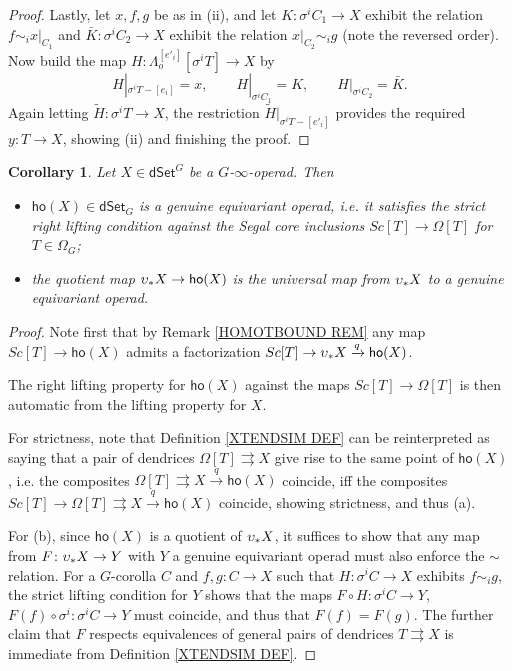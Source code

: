 \documentclass[a4paper,10pt
,draft
]{article}%
\numberwithin{equation}{section}
\numberwithin{figure}{section}
\newtheorem{corollary}[equation]{Corollary}%
\theoremstyle{definition} %
\newcommand{\1}{\ensuremath{\mathbbm 1}}%
\begin{document}
\begin{proof}
Lastly, let $x,f,g$ be as in (ii), 
and let
$K \colon \sigma^i C_1 \to X$ exhibit the relation
$f \sim_i x|_{C_1}$
and 
$ \bar{K} \colon \sigma^i C_2 \to X$
exhibit the relation
$x|_{C_2} \sim_i g$ (note the reversed order).
Now build the map
$H \colon \Lambda_o^{[e'_i]}[\sigma^i T] \to X$ by
\[
	H|_{\sigma^i T - [e_i]} = x,
\qquad
	H|_{\sigma^i C_1} = K,
\qquad
	H|_{\sigma^i C_2} = \bar{K}.
\]
Again letting 
$\widetilde{H} \colon \sigma^i T \to X$,
the restriction 
$\widetilde{H}|_{\sigma^i T - [e'_i]}$
provides the required $y \colon T \to X$,
showing (ii) and finishing the proof.
\end{proof}


\begin{corollary}\label{HOOPUNIV COR}
Let $X \in \mathsf{dSet}^G$ be a $G$-$\infty$-operad. Then
	\begin{itemize}
	\item[(a)] $\mathsf{ho}(X)\in \mathsf{dSet}_G$ is a genuine equivariant operad, i.e. it satisfies the strict right lifting condition against the Segal core inclusions
	$Sc[T] \to \Omega[T]$ for $T \in \Omega_G$;
	\item[(b)] the quotient map
	$\upsilon_{\**}X \to \mathsf{ho}(X)$ is the universal map from $\upsilon_{\**}X$ to a genuine equivariant operad.
	\end{itemize}
\end{corollary}

\begin{proof}
	Note first that by Remark \ref{HOMOTBOUND REM}
	any map 	$Sc[T] \to \mathsf{ho}(X)$ admits a factorization 
	$Sc[T] \to \upsilon_{\**}X \xrightarrow{q} \mathsf{ho}(X)$.
	
	The right lifting property for $\mathsf{ho}(X)$
	against the maps $Sc[T] \to \Omega[T]$
	is then automatic from the lifting property for $X$.

	For strictness,	
	note that Definition \ref{XTENDSIM DEF}
	can be reinterpreted as saying that
	a pair of dendrices $\Omega[T] \rightrightarrows X$
	give rise to the same point of 
	$\mathsf{ho}(X)$, i.e. 
	the composites 
	$\Omega[T] \rightrightarrows X \xrightarrow{q}
	\mathsf{ho}(X)$ coincide, 
	iff the composites 
	$Sc[T] \to \Omega[T] \rightrightarrows X \xrightarrow{q}
	\mathsf{ho}(X)$ coincide, showing strictness, and thus (a).
		
	For (b), since $\mathsf{ho}(X)$ is a quotient of
	$\upsilon_{\**} X$, it suffices to show that any map
	from $F \colon \upsilon_{\**}X \to Y$ with $Y$ a genuine equivariant operad must also enforce the $\sim$ relation.
	For a $G$-corolla $C$ and
	$f,g\colon C \to X$ such that 
	$H \colon \sigma^i C \to X$ exhibits
	$f \sim_i g$, 
	the strict lifting condition for $Y$
	shows that the maps
	$F\circ H \colon \sigma^i C \to Y$,
	$F(f) \circ \sigma^i \colon \sigma^i C \to Y$
	must coincide, and thus that
	$F(f)=F(g)$.
	The further claim that $F$ respects equivalences
	of general pairs of dendrices $T \rightrightarrows X$
	is immediate from Definition \ref{XTENDSIM DEF}.
\end{proof}
\end{document}
